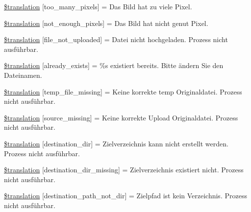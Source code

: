 \begin{DoxyCompactItemize}
\item 
\hyperlink{class_8upload_8de___d_e_8php_aa4051ef64e94a3f8295c63cf85544016}{\$translation} \mbox{[}\textquotesingle{}too\+\_\+many\+\_\+pixels\textquotesingle{}\mbox{]} = \textquotesingle{}Das Bild hat zu viele Pixel.\textquotesingle{}
\item 
\hyperlink{class_8upload_8de___d_e_8php_a1fe342c27ce61f4ff4e0120ba647033e}{\$translation} \mbox{[}\textquotesingle{}not\+\_\+enough\+\_\+pixels\textquotesingle{}\mbox{]} = \textquotesingle{}Das Bild hat nicht genut Pixel.\textquotesingle{}
\item 
\hyperlink{class_8upload_8de___d_e_8php_a4ce76e7be0b3a03c2b47f6d70c21832e}{\$translation} \mbox{[}\textquotesingle{}file\+\_\+not\+\_\+uploaded\textquotesingle{}\mbox{]} = \textquotesingle{}Datei nicht hochgeladen. Prozess nicht ausführbar.\textquotesingle{}
\item 
\hyperlink{class_8upload_8de___d_e_8php_afd84e910217f04139f567c41e292afa5}{\$translation} \mbox{[}\textquotesingle{}already\+\_\+exists\textquotesingle{}\mbox{]} = \textquotesingle{}\%s existiert bereits. Bitte ändern Sie den Dateinamen.\textquotesingle{}
\item 
\hyperlink{class_8upload_8de___d_e_8php_ab0fa87a88aba2624004581eed0633325}{\$translation} \mbox{[}\textquotesingle{}temp\+\_\+file\+\_\+missing\textquotesingle{}\mbox{]} = \textquotesingle{}Keine korrekte temp Originaldatei. Prozess nicht ausführbar.\textquotesingle{}
\item 
\hyperlink{class_8upload_8de___d_e_8php_aceaaf7355acaaf10f0ae60378d03c468}{\$translation} \mbox{[}\textquotesingle{}source\+\_\+missing\textquotesingle{}\mbox{]} = \textquotesingle{}Keine korrekte Upload Originaldatei. Prozess nicht ausführbar.\textquotesingle{}
\item 
\hyperlink{class_8upload_8de___d_e_8php_aff2427c72a2598aefa6d58df1dd18b08}{\$translation} \mbox{[}\textquotesingle{}destination\+\_\+dir\textquotesingle{}\mbox{]} = \textquotesingle{}Zielverzeichnis kann nicht erstellt werden. Prozess nicht ausführbar.\textquotesingle{}
\item 
\hyperlink{class_8upload_8de___d_e_8php_a9ef28d3cf09942c6c0a1e77fa09185e8}{\$translation} \mbox{[}\textquotesingle{}destination\+\_\+dir\+\_\+missing\textquotesingle{}\mbox{]} = \textquotesingle{}Zielverzeichnis existiert nicht. Prozess nicht ausführbar.\textquotesingle{}
\item 
\hyperlink{class_8upload_8de___d_e_8php_a5704a67137126e8c87b7a364175929d4}{\$translation} \mbox{[}\textquotesingle{}destination\+\_\+path\+\_\+not\+\_\+dir\textquotesingle{}\mbox{]} = \textquotesingle{}Zielpfad ist kein Verzeichnis. Prozess nicht ausführbar.\textquotesingle{}

\end{DoxyCompactItemize}
